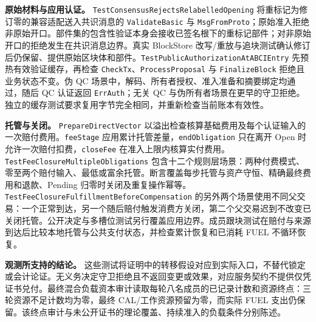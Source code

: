 \noindent\textbf{原始材料与应用认证。}
\texttt{Test\allowbreak Consensus\allowbreak Rejects\allowbreak Relabelled\allowbreak Opening} 将重标记为修订零的兼容适配送入共识消息的 \texttt{Validate\allowbreak Basic} 与 \texttt{Msg\allowbreak From\allowbreak Proto}；原始准入拒绝非原始开口。部件集的包含性验证本身会接收已签名根下的重标记部件；对非原始开口的拒绝发生在共识消息边界。真实 BlockStore 改写/重放与追块测试确认修订后仍保留、提供原始区块体和部件。\texttt{Test\allowbreak Public\allowbreak Authorization\allowbreak At\allowbreak ABCIEntry} 先预热有效验证缓存，再检查 \texttt{CheckTx}、\texttt{ProcessProposal} 与 \texttt{FinalizeBlock} 拒绝且业务状态不变。伪 QC 场景中，解码、所有者授权、准入准备和摘要绑定均通过，随后 QC 认证返回 \texttt{ErrAuth}；无关 QC 与伪所有者场景在更早的守卫拒绝。独立的缓存测试要求复用字节完全相同，并重新检查当前账本有效性。

\noindent\textbf{托管与关闭。}
\texttt{PrepareDirectVector} 以溢出检查核算基础费用及每个认证输入的一次赔付费用。\texttt{feeStage} 应用累计托管差量，\texttt{endObligation} 只在离开 Open 时允许一次赔付扣费，\texttt{closeFee} 在准入上限内核算实付费用。\texttt{Test\allowbreak Fee\allowbreak Closure\allowbreak Multiple\allowbreak Obligations} 包含十二个规则层场景：两种付费模式、零至两个赔付输入、最低或富余托管。断言覆盖每步托管与资产守恒、精确最终费用和退款、Pending 归零时关闭及重复操作幂等。\texttt{Test\allowbreak Fee\allowbreak Closure\allowbreak Fulfillment\allowbreak Before\allowbreak Compensation} 的另外两个场景使用不同父交易：一个正常到达，另一个随后赔付触发消费方关闭，第二个父交易迟到不改变已关闭托管。公开决定与多槽位测试另行覆盖应用边界。成员跟块测试在赔付与来源到达后比较本地托管与公共支付状态，并检查累计恢复和已消耗 FUEL 不循环恢复。

\noindent\textbf{观测所支持的结论。}
这些测试将证明中的转移假设对应到实际入口，不替代锁定或会计论证。无义务决定守卫拒绝且不返回变更或效果，对应服务契约不提供仅凭证书兑付。最终混合负载资本审计读取每轮八名成员的已记录计数和资源终点：三轮资源不足计数均为零，最终 CAL/工作资源预留为零，而实际 FUEL 支出仍保留。该终点审计与未公开证书的理论覆盖、持续准入的负载条件分别陈述。
